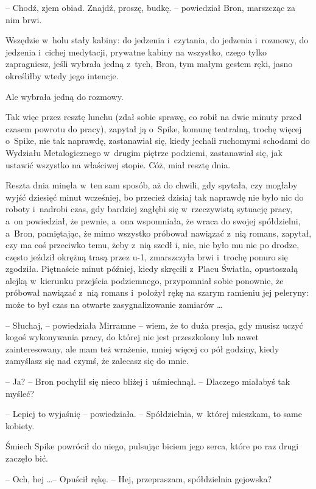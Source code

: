 \documentclass[oneside,polish,11pt,rmheadings]{mwbk}
\begin{document}
-- Chodź, zjem obiad. Znajdź, proszę, budkę. -- powiedział Bron, marszcząc za nim brwi. 

Wszędzie w~holu stały kabiny: do jedzenia i~czytania, do jedzenia i~rozmowy, do jedzenia i~cichej medytacji, prywatne kabiny na wszystko, czego tylko zapragniesz, jeśli wybrała jedną z~tych, Bron, tym małym gestem ręki, jasno określiłby wtedy jego intencje. 

Ale wybrała jedną do rozmowy. 

Tak więc przez resztę lunchu (zdał sobie sprawę, co robił na dwie minuty przed czasem powrotu do pracy), zapytał ją o~Spike, komunę teatralną, trochę więcej o~Spike, nie tak naprawdę, zastanawiał się, kiedy jechali ruchomymi schodami do Wydziału Metalogicznego w~drugim piętrze podziemi, zastanawiał się, jak ustawić wszystko na właściwej stopie. Cóż, miał resztę dnia. 

Reszta dnia minęła w~ten sam sposób, aż do chwili, gdy spytała, czy mogłaby wyjść dziesięć minut wcześniej, bo przecież dzisiaj tak naprawdę nie było nic do roboty i~nadrobi czas, gdy bardziej zagłębi się w~rzeczywistą sytuację pracy, a~on powiedział, że pewnie, a~ona wspomniała, że wraca do swojej spółdzielni, a~Bron, pamiętając, że mimo wszystko próbował nawiązać z~nią romans, zapytał, czy ma coś przeciwko temu, żeby z~nią szedł i, nie, nie było mu nie po drodze, często jeździł okrężną trasą przez u-1, zmarszczyła brwi i~trochę ponuro się zgodziła. Piętnaście minut później, kiedy skręcili z~Placu Światła, opustoszałą alejką w~kierunku przejścia podziemnego, przypomniał sobie ponownie, że próbował nawiązać z~nią romans i~położył rękę na szarym ramieniu jej peleryny: może to był czas na otwarte zasygnalizowanie zamiarów \ldots  

-- Słuchaj, -- powiedziała Mirramne -- wiem, że to duża presja, gdy musisz uczyć kogoś wykonywania pracy, do której nie jest przeszkolony lub nawet zainteresowany, ale mam też wrażenie, mniej więcej co pół godziny, kiedy zamyślasz się nad czymś, że zalecasz się do mnie. 

-- Ja? -- Bron pochylił się nieco bliżej i~uśmiechnął. -- Dlaczego miałabyś tak myśleć? 

-- Lepiej to wyjaśnię -- powiedziała. -- Spółdzielnia, w~której mieszkam, to same kobiety. 

Śmiech Spike powrócił do niego, pulsując biciem jego serca, które po raz drugi zaczęło bić. 

-- Och, hej \ldots  -- Opuścił rękę. -- Hej, przepraszam, spółdzielnia gejowska? 
\end{document}
